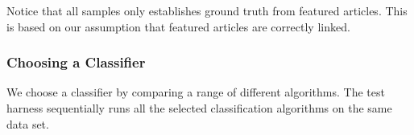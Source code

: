 Notice that all samples only establishes ground truth from featured articles. This is based on our assumption that featured articles are correctly linked.

\subsubsection{Choosing a Classifier}
We choose a classifier by comparing a range of different algorithms. The test harness sequentially runs all the selected classification algorithms on the same data set.

